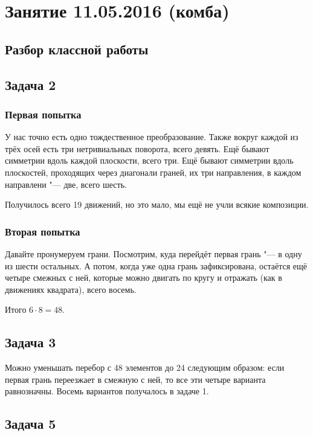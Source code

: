 \chapter{Занятие 11.05.2016 (комба)}

\section{Разбор классной работы}
\section{Задача 2}
\subsection{Первая попытка}
	У нас точно есть одно тождественное преобразование.
	Также вокруг каждой из трёх осей есть три нетривиальных поворота, всего девять.
	Ещё бывают симметрии вдоль каждой плоскости, всего три.
	Ещё бывают симметрии вдоль плоскостей, проходящих через диагонали граней,
	их три направления, в каждом направлени "--- две, всего шесть.

	Получилось всего 19 движений, но это мало, мы ещё не учли всякие композиции.

\subsection{Вторая попытка}
	Давайте пронумеруем грани.
	Посмотрим, куда перейдёт первая грань "--- в одну из шести остальных.
	А потом, когда уже одна грань зафиксирована, остаётся ещё четыре смежных с ней,
	которые можно двигать по кругу и отражать (как в движениях квадрата), всего восемь.

	Итого $6 \cdot 8 = 48$.

\section{Задача 3}
	Можно уменьшать перебор с 48 элементов до 24 следующим образом: если первая грань переезжает
	в смежную с ней, то все эти четыре варианта равнозначны.
	Восемь вариантов получалось в задаче 1.

\section{Задача 5}
	